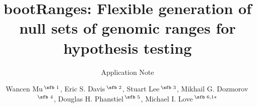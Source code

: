 \documentclass{bioinfo}
\begin{document}

\subtitle{Application Note}

\title[bootRanges]{bootRanges: Flexible generation of null sets of genomic ranges for hypothesis testing}
\author[Mu \textit{et~al}.]{Wancen Mu\,$^{\text{\sfb 1}}$, Eric S. Davis\,$^{\text{\sfb 2}}$, Stuart Lee\,$^{\text{\sfb 3}}$, Mikhail G. Dozmorov\,$^{\text{\sfb 4}}$, Douglas H. Phanstiel\,$^{\text{\sfb 5}}$, Michael I. Love\,$^{\text{\sfb 6,1}*}$}
 
\address{$^{\text{\sf 1}}$Department of Biostatistics, University of North Carolina-Chapel Hill $^{\text{\sf 2}}$Curriculum in Bioinformatics and Computational Biology, University of North Carolina-Chapel Hill $^{\text{\sf 3}}$Genentech, South San Francisco $^{\text{\sf 4}}$Department of Biostatistics, Department of Pathology, Virginia Commonwealth University $^{\text{\sf 5}}$Thurston Arthritis Research Center, Department of Cell Biology \& Physiology, Lineberger Comprehensive Cancer Center, Curriculum in Genetics \& Molecular Biology, University of North Carolina-Chapel Hill and $^{\text{\sf 6}}$Department of Genetics, University of North Carolina-Chapel Hill}

% 





\maketitle
{}





%
%
%
%
%
%
%

\end{document}
